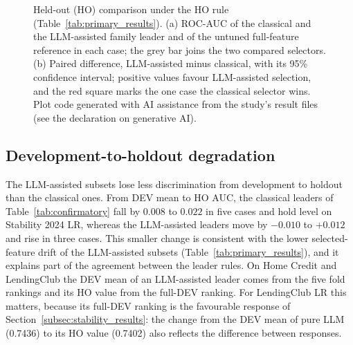 \documentclass[final,5p,twocolumn]{elsarticle}
\begin{document}
\begin{figure}[htbp]
\caption{Held-out (HO) comparison under the HO rule (Table~\ref{tab:primary_results}). (a) ROC-AUC of the classical and the LLM-assisted family leader and of the untuned full-feature reference in each case; the grey bar joins the two compared selectors. (b) Paired difference, LLM-assisted minus classical, with its 95\% confidence interval; positive values favour LLM-assisted selection, and the red square marks the one case the classical selector wins. Plot code generated with AI assistance from the study's result files (see the declaration on generative AI).}
\label{fig:primary}
\end{figure}

\subsection{Development-to-holdout degradation}
\label{subsec:dev_to_ho}

The LLM-assisted subsets lose less discrimination from development to holdout than the classical ones. From DEV mean to HO AUC, the classical leaders of Table~\ref{tab:confirmatory} fall by $0.008$ to $0.022$ in five cases and hold level on Stability 2024 LR, whereas the LLM-assisted leaders move by $-0.010$ to $+0.012$ and rise in three cases. This smaller change is consistent with the lower selected-feature drift of the LLM-assisted subsets (Table~\ref{tab:primary_results}), and it explains part of the agreement between the leader rules. On Home Credit and LendingClub the DEV mean of an LLM-assisted leader comes from the five fold rankings and its HO value from the full-DEV ranking. For LendingClub LR this matters, because its full-DEV ranking is the favourable response of Section~\ref{subsec:stability_results}: the change from the DEV mean of pure LLM (0.7436) to its HO value (0.7402) also reflects the difference between responses.
\end{document}
